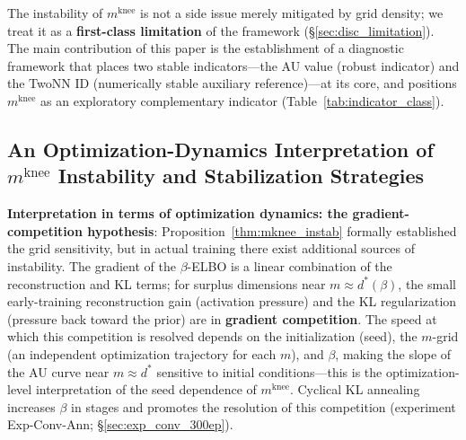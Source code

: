 \documentclass[make,article,submit,pdftex,moreauthors]{Definitions/mdpi}
\newcommand{\mknee}{m^{\mathrm{knee}}}
\begin{document}
The instability of $\mknee$ is not a side issue merely mitigated by grid density;
we treat it as a \textbf{first-class limitation} of the framework
(\S\ref{sec:disc_limitation}).
The main contribution of this paper is the establishment of a diagnostic framework
that places two stable indicators---the AU value (robust indicator) and the TwoNN ID
(numerically stable auxiliary reference)---at its core, and positions $\mknee$ as an
exploratory complementary indicator (Table~\ref{tab:indicator_class}).

\subsection{An Optimization-Dynamics Interpretation of $\mknee$ Instability and Stabilization Strategies}\label{sec:disc_mknee_improve}

\textbf{Interpretation in terms of optimization dynamics: the gradient-competition hypothesis}:
Proposition~\ref{thm:mknee_instab} formally established the grid sensitivity, but in
actual training there exist additional sources of instability.
The gradient of the $\beta$-ELBO is a linear combination of the reconstruction and
KL terms; for surplus dimensions near $m \approx d^*(\beta)$, the small early-training
reconstruction gain (activation pressure) and the KL regularization (pressure back
toward the prior) are in \textbf{gradient competition}.
The speed at which this competition is resolved depends on the initialization (seed),
the $m$-grid (an independent optimization trajectory for each $m$), and $\beta$,
making the slope of the AU curve near $m \approx d^*$ sensitive to initial
conditions---this is the optimization-level interpretation of the seed dependence of
$\mknee$.
Cyclical KL annealing~\cite{fu2019cyclical} increases $\beta$ in stages and promotes
the resolution of this competition (experiment Exp-Conv-Ann; \S\ref{sec:exp_conv_300ep}).
\end{document}
